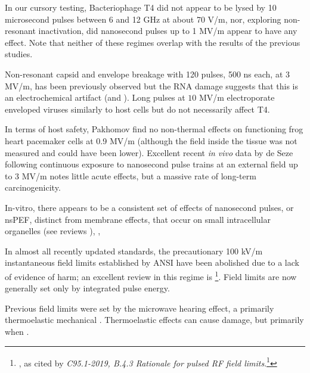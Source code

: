 \documentclass[paper.tex]{subfiles}
\begin{document}
\begin{multicols}{1}
In our cursory testing, Bacteriophage T4 did not appear to be lysed by 10 microsecond pulses between 6 and 12 GHz at about 70 V/m, nor, exploring non-resonant inactivation, did nanosecond pulses up to 1 MV/m appear to have any effect. Note that neither of these regimes overlap with the results of the previous studies.

Non-resonant capsid and envelope breakage with 120 pulses, 500 ns each, at 3 MV/m, has been previously observed\cite{Inactivation1990} but the RNA damage suggests that this is an electrochemical artifact \cite{Formation1996} (and \cite{Microwave1987}). Long pulses at $10$ MV/m electroporate enveloped viruses similarly to host cells\cite{AC2017} but do not necessarily affect T4\cite{Manipulation2013}. 

In terms of host safety, Pakhomov \cite{Comparative} find no non-thermal effects on functioning frog heart pacemaker cells at 0.9 MV/m (although the field inside the tissue was not measured and could have been lower). Excellent recent \textit{in vivo} data by de Seze following continuous exposure to nanosecond pulse trains at an external field up to 3 MV/m \cite{Repeated2020} notes little acute effects, but a massive rate of long-term carcinogenicity. 

In-vitro, there appears to be a consistent set of effects of nanosecond pulses, or nsPEF, distinct from membrane effects, that occur on small intracellular organelles (see reviews \cite{Penetration2016c} \cite{Effects2016} ), \cite{Bioeffects}, 

In almost all recently updated standards, the precautionary 100 kV/m instantaneous field limits established by ANSI have been abolished due to a lack of evidence of harm; an excellent review in this regime is \footnote{\cite{treatyelectromagnetic}, as cited by \textit{C95.1-2019, B.4.3 Rationale for pulsed RF field limits}.\footnote{That same review also contains the following, which highlights the incredible difficulty of obtaining reliable results in this field: "Dr. de Seze also described an experiment in which two sham groups were mistakenly run and a significant difference was found. Dr. Klauenberg noted another series of experiments he reviewed where experimental treatment groups did not vary while the sham groups compared to each other did resulting in a significant difference that was otherwise meaningless."}}. Field limits are now generally set only by integrated pulse energy.

Previous field limits were set by the microwave hearing effect, a primarily thermoelastic mechanical \cite{MICROWAVEINDUCED1975}. Thermoelastic effects can cause damage, but primarily when \cite{Thermoacoustic2017}\cite{MECHANICAL1968}. \cite{Radiation1996}


\end{multicols}
\end{document}
